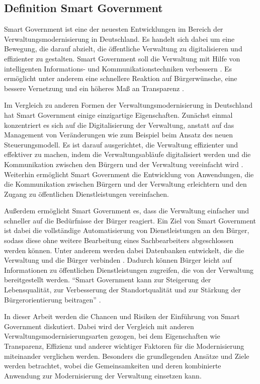 \subsection{Definition Smart Government}
Smart Government ist eine der neuesten Entwicklungen im Bereich der Verwaltungsmodernisierung in Deutschland. 
Es handelt sich dabei um eine Bewegung, die darauf abzielt, die öffentliche Verwaltung zu digitalisieren und effizienter zu gestalten. 
Smart Government soll die Verwaltung mit Hilfe von intelligenten Informations- und Kommunikationstechniken verbessern \citep[][S.178]{von_Lucke_2016}.
Es ermöglicht unter anderem eine schnellere Reaktion auf Bürgerwünsche, eine bessere Vernetzung und ein höheres Maß an Transparenz \citep[Vgl][S.87]{Kersting2017}.
\par
Im Vergleich zu anderen Formen der Verwaltungsmodernisierung in Deutschland hat Smart Government einige einzigartige Eigenschaften. 
Zunächst einmal konzentriert es sich auf die Digitalisierung der Verwaltung, anstatt auf das Management von Veränderungen wie zum Beispiel beim Ansatz des neuen Steuerungsmodell. 
Es ist darauf ausgerichtet, die Verwaltung effizienter und effektiver zu machen, indem die Verwaltungsabläufe digitalisiert werden und die Kommunikation zwischen den Bürgern und der Verwaltung vereinfacht wird \citep[Vgl.][]{von_Lucke_2016}.
Weiterhin ermöglicht Smart Government die Entwicklung von Anwendungen, die die Kommunikation zwischen Bürgern und der Verwaltung erleichtern und den Zugang zu öffentlichen Dienstleistungen vereinfachen. 
\par
Außerdem ermöglicht Smart Government es, dass die Verwaltung einfacher und schneller auf die Bedürfnisse der Bürger reagiert. 
Ein Ziel von Smart Government ist dabei die vollständige Automatisierung von Dienstleistungen an den Bürger, sodass diese ohne weitere Bearbeitung eines Sachbearbeiters abgeschlossen werden können.
Unter anderem werden dabei Datenbanken entwickelt, die die Verwaltung und die Bürger verbinden \citep[Vgl.][]{von_Lucke_2016}. 
Dadurch können Bürger leicht auf Informationen zu öffentlichen Dienstleistungen zugreifen, die von der Verwaltung bereitgestellt werden.
``Smart Government kann zur Steigerung der Lebensqualität, zur Verbesserung der Standortqualität und zur Stärkung der Bürgerorientierung beitragen'' \citep[][]{von_Lucke_2016}. 
\par
In dieser Arbeit werden die Chancen und Risiken der Einführung von Smart Government diskutiert.
Dabei wird der Vergleich mit anderen Verwaltungsmodernisierungsarten gezogen, bei dem Eigenschaften wie Transparenz, Effizienz und anderer wichtiger Faktoren für die Modernisierung miteinander verglichen werden.
Besonders die grundlegenden Ansätze und Ziele werden betrachtet, wobei die Gemeinsamkeiten und deren kombinierte Anwendung zur Modernisierung der Verwaltung einsetzen kann.

